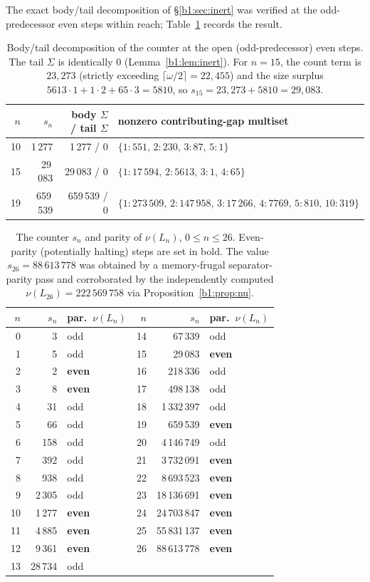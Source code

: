 \documentclass[a4paper]{article}
\theoremstyle{plain}
\theoremstyle{definition}
\theoremstyle{remark}
\begin{document}
The exact body/tail decomposition of \S\ref{b1:sec:inert} was verified at the odd-predecessor even steps within reach; Table~\ref{b1:tab:decomp} records the result.

\begin{table}[H]\centering
\begin{tabular}{rrr|l}
$n$ & $s_n$ & body $\Sigma$ / tail $\Sigma$ & nonzero contributing-gap multiset\\
\hline
10 & 1\,277 & 1\,277 / 0 & $\{1:551,\,2:230,\,3:87,\,5:1\}$\\
15 & 29\,083 & 29\,083 / 0 & $\{1:17\,594,\,2:5613,\,3:1,\,4:65\}$\\
19 & 659\,539 & 659\,539 / 0 & $\{1:273\,509,\,2:147\,958,\,3:17\,266,\,4:7769,\,5:810,\,10:319\}$
\end{tabular}
\caption{Body/tail decomposition of the counter at the open (odd-predecessor) even steps. The tail $\Sigma$ is identically $0$ (Lemma~\ref{b1:lem:inert}). For $n=15$, the count term is $23{,}273$ (strictly exceeding $\lceil\omega/2\rceil=22{,}455$) and the size surplus $5613\cdot 1+1\cdot 2+65\cdot 3=5810$, so $s_{15}=23{,}273+5810=29{,}083$.}
\label{b1:tab:decomp}
\end{table}

\begin{table}[H]\centering
\begin{tabular}{rrl|rrl}
$n$ & $s_n$ & par.\ $\nu(L_n)$ & $n$ & $s_n$ & par.\ $\nu(L_n)$\\
\hline
0 & 3 & odd & 14 & 67\,339 & odd\\
1 & 5 & odd & 15 & 29\,083 & \textbf{even}\\
2 & 2 & \textbf{even} & 16 & 218\,336 & odd\\
3 & 8 & \textbf{even} & 17 & 498\,138 & odd\\
4 & 31 & odd & 18 & 1\,332\,397 & odd\\
5 & 66 & odd & 19 & 659\,539 & \textbf{even}\\
6 & 158 & odd & 20 & 4\,146\,749 & odd\\
7 & 392 & odd & 21 & 3\,732\,091 & \textbf{even}\\
8 & 938 & odd & 22 & 8\,693\,523 & \textbf{even}\\
9 & 2\,305 & odd & 23 & 18\,136\,691 & \textbf{even}\\
10 & 1\,277 & \textbf{even} & 24 & 24\,703\,847 & \textbf{even}\\
11 & 4\,885 & \textbf{even} & 25 & 55\,831\,137 & \textbf{even}\\
12 & 9\,361 & \textbf{even} & 26 & 88\,613\,778 & \textbf{even}\\
13 & 28\,734 & odd & & &
\end{tabular}
\caption{The counter $s_n$ and parity of $\nu(L_n)$, $0\le n\le 26$. Even-parity (potentially halting) steps are set in bold. The value $s_{26}=88\,613\,778$ was obtained by a memory-frugal separator-parity pass and corroborated by the independently computed $\nu(L_{26})=222\,569\,758$ via Proposition~\ref{b1:prop:nu}.}
\label{b1:tab:traj}
\end{table}
\end{document}
